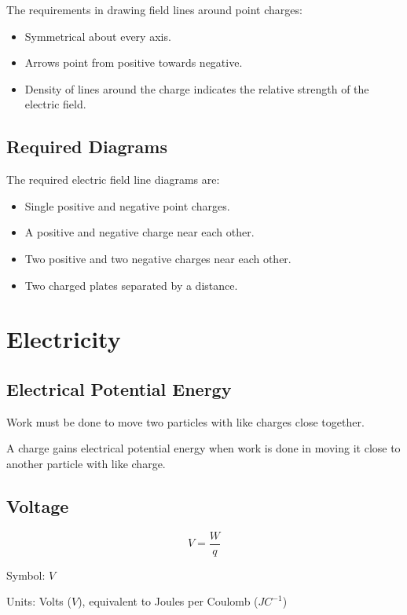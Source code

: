 \documentclass[a4paper,11pt]{article}
\begin{document}
The requirements in drawing field lines around point charges:

\begin{itemize}
\item Symmetrical about every axis.
\item Arrows point from positive towards negative.
\item Density of lines around the charge indicates the relative strength of the
	electric field.
\end{itemize}


\subsection{Required Diagrams}

The required electric field line diagrams are:

\begin{itemize}
\item Single positive and negative point charges.
\item A positive and negative charge near each other.
\item Two positive and two negative charges near each other.
\item Two charged plates separated by a distance.
\end{itemize}




\section{Electricity}

\subsection{Electrical Potential Energy}

Work must be done to move two particles with like charges close together.

A charge gains electrical potential energy when work is done in moving it close
to another particle with like charge.


\subsection{Voltage}

$$
V = \frac{W}{q}
$$

Symbol: $V$

Units: Volts ($V$), equivalent to Joules per Coulomb ($JC^{-1}$)
\end{document}
